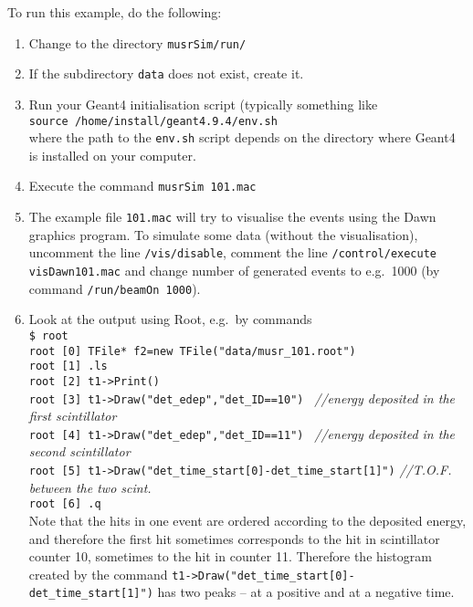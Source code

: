 \documentclass[twoside]{dis04}
\begin{document}
To run this example, do the following:
\begin{enumerate}
\item Change to the directory {\tt musrSim/run/}
\item If the subdirectory {\tt data} does not exist, create it.
\item Run your Geant4 initialisation script (typically something like \\
  {\tt source /home/install/geant4.9.4/env.sh}\\
  where the path to the {\tt env.sh} script depends on the directory where Geant4 
  is installed on your computer.
\item Execute the command {\tt musrSim 101.mac}
\item The example file {\tt 101.mac} will try to visualise the events using the
  Dawn graphics program.  To simulate some data (without the visualisation),
  uncomment the line {\tt /vis/disable}, comment the line 
  {\tt /control/execute visDawn101.mac} and change number of generated events
  to e.g.\ 1000  (by command {\tt /run/beamOn 1000}).
\item Look at the output using Root, e.g.\ by commands \\
  {\tt \$ root} \\
  {\tt root [0] TFile* f2=new TFile("data/musr\_101.root") } \\
  {\tt root [1]  .ls } \\
  {\tt root [2] t1->Print() } \\
  {\tt root [3] t1->Draw("det\_edep","det\_ID==10") }  \emph{\small //energy deposited in the first scintillator}\\
  {\tt root [4] t1->Draw("det\_edep","det\_ID==11") }  \emph{\small //energy deposited in the second scintillator}\\
  {\tt root [5] t1->Draw("det\_time\_start[0]-det\_time\_start[1]")}  \emph{\small //T.O.F. between the two scint.} \\
  {\tt root [6] .q}\\
  Note that the hits in one event are ordered according to the deposited energy, and therefore the
  first hit sometimes corresponds to the hit in scintillator counter 10, sometimes to the hit in counter 11.
  Therefore the histogram created by the command {\tt t1->Draw("det\_time\_start[0]-det\_time\_start[1]")}
  has two peaks -- at a positive and at a negative time.
\end{enumerate}
\end{document}
